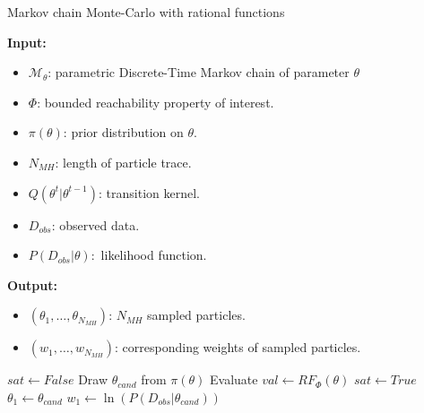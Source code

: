\begin{algorithm}[H]
      \caption{Markov chain Monte-Carlo with rational functions}
      \label{rf-mcmc-alg}
      \hspace*{\algorithmicindent} \textbf{Input:}
      \begin{itemize}
            \item $\mathcal{M}_\theta$: parametric Discrete-Time Markov chain of parameter $\theta$
            \item $\Phi$: bounded reachability property of interest.
            \item $\pi(\theta)$: prior distribution on $\theta$.
            \item $N_{MH}$: length of particle trace.
            \item $Q(\theta^t|\theta^{t-1})$: transition kernel.
            \item $D_{obs}$: observed data.
            \item $P(D_{obs}|\theta):$ likelihood function.
      \end{itemize}
      \hspace*{\algorithmicindent} \textbf{Output:}
      \begin{itemize}
            \item $(\theta_1,\ldots,\theta_{N_{MH}})$: $N_{MH}$ sampled particles.
            \item $(w_1,\ldots,w_{N_{MH}})$: corresponding weights of sampled particles.
      \end{itemize}
      \begin{algorithmic}[1]
            \State $sat \leftarrow False$
            \State Draw $\theta_{cand}$ from $\pi(\theta)$
            \State Evaluate $val \leftarrow RF_{\Phi}(\theta)$
            \State $sat \leftarrow True$
            \EndIf
            \EndWhile
            \State $\theta_1 \leftarrow  \theta_{cand}$
            \State $w_1 \leftarrow  \ln(P(D_{obs}|\theta_{cand}))$
      \end{algorithmic}
\end{algorithm}
